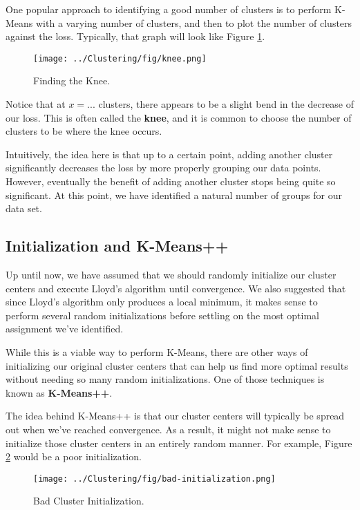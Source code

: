 One popular approach to identifying a good number of clusters is to perform K-Means with a varying number of clusters, and then to plot the number of clusters against the loss. Typically, that graph will look like Figure \ref{fig:knee}.

\begin{figure}
    \centering
    \texttt{[image: ../Clustering/fig/knee.png]}
    \caption{Finding the Knee.}
    \label{fig:knee}
\end{figure}

Notice that at $x=...$ clusters, there appears to be a slight bend in the decrease of our loss. This is often called the \textbf{knee}, and it is common to choose the number of clusters to be where the knee occurs.

Intuitively, the idea here is that up to a certain point, adding another cluster significantly decreases the loss by more properly grouping our data points. However, eventually the benefit of adding another cluster stops being quite so significant. At this point, we have identified a natural number of groups for our data set.

\subsection{Initialization and K-Means++}
Up until now, we have assumed that we should randomly initialize our cluster centers and execute Lloyd's algorithm until convergence. We also suggested that since Lloyd's algorithm only produces a local minimum, it makes sense to perform several random initializations before settling on the most optimal assignment we've identified.

While this is a viable way to perform K-Means, there are other ways of initializing our original cluster centers that can help us find more optimal results without needing so many random initializations. One of those techniques is known as \textbf{K-Means++}.

The idea behind K-Means++ is that our cluster centers will typically be spread out when we've reached convergence. As a result, it might not make sense to initialize those cluster centers in an entirely random manner. For example, Figure \ref{fig:bad-init} would be a poor initialization.

\begin{figure}
    \centering
    \texttt{[image: ../Clustering/fig/bad-initialization.png]}
    \caption{Bad Cluster Initialization.}
    \label{fig:bad-init}
\end{figure}

